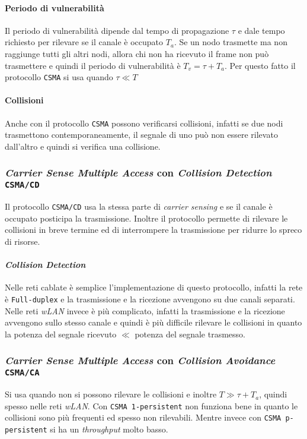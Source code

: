             \paragraph{Periodo di vulnerabilità} Il periodo di vulnerabilità dipende dal tempo di propagazione $\tau$ e dale tempo richiesto per rilevare se il canale è occupato $T_a$. Se un nodo trasmette ma non raggiunge tutti gli altri nodi, allora chi non ha ricevuto il frame non può trasmettere e quindi il periodo di vulnerabilità è $T_v=\tau+T_a$. Per questo fatto il protocollo \texttt{CSMA} si usa quando $\tau\ll T$ 
            \paragraph{Collisioni} Anche con il protocollo \texttt{CSMA} possono verificarsi collisioni, infatti se due nodi trasmettono contemporaneamente, il segnale di uno può non essere rilevato dall'altro e quindi si verifica una collisione.
        \subsubsection{\textit{Carrier Sense Multiple Access} con \textit{Collision Detection} \texttt{CSMA/CD}}
            Il protocollo \texttt{CSMA/CD} usa la stessa parte di \textit{carrier sensing} e se il canale è occupato posticipa la trasmissione. Inoltre il protocollo permette di rilevare le collisioni in breve termine ed di interrompere la trasmissione per ridurre lo spreco di risorse.
            \paragraph{\textit{Collision Detection}} Nelle reti cablate è semplice l'implementazione di questo protocollo, infatti la rete è \texttt{Full-duplex} e la trasmissione e la ricezione avvengono su due canali separati. Nelle reti \textit{wLAN} invece è più complicato, infatti la trasmissione e la ricezione avvengono sullo stesso canale e quindi è più difficile rilevare le collisioni in quanto la potenza del segnale ricevuto $\ll$ potenza del segnale trasmesso.
        \subsubsection{\textit{Carrier Sense Multiple Access} con \textit{Collision Avoidance} \texttt{CSMA/CA}}
            Si usa quando non si possono rilevare le collisioni e inoltre $T\gg \tau+T_a$, quindi spesso nelle reti \textit{wLAN}. Con \texttt{CSMA 1-persistent} non funziona bene in quanto le collisioni sono più frequenti ed spesso non rilevabili. Mentre invece con \texttt{CSMA p-persistent} si ha un \textit{throughput} molto basso.

